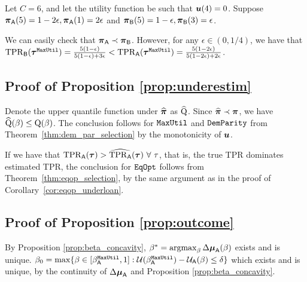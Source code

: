 	\begin{exmp}
		Let $C=6$, and let the utility function be such that 
		$\boldsymbol{u}(4) = 0$. 
		Suppose $\boldsymbol{\pi}_{\mathsf{A}}(5) = 1-2\epsilon, \boldsymbol{\pi}_{\mathsf{A}}(1) =  2\epsilon$ and $\boldsymbol{\pi}_{\mathsf{B}}(5) = 1-\epsilon, \boldsymbol{\pi}_{\mathsf{B}}(3) = \epsilon$.
		
		We can easily check that $\boldsymbol{\pi}_{\mathsf{A}}\prec \boldsymbol{\pi}_{\mathsf{B}}$. However, for any $\epsilon \in (0,1/4)$, we have that $\mathrm{TPR}_{\mathsf{B}}(\boldsymbol{\tau}^{\mathtt{MaxUtil}}) = \frac{5(1-\epsilon)}{5(1-\epsilon)+3\epsilon} < \mathrm{TPR}_{\mathsf{A}}(\boldsymbol{\tau}^{\mathtt{MaxUtil}}) = \frac{5(1-2\epsilon)}{5(1-2\epsilon)+2\epsilon}$.
		 
	\end{exmp}
	
	
	 \subsection{Proof of Proposition \ref{prop:underestim}}
	 
	 Denote the upper quantile function under $\widehat{\boldsymbol{\pi}}$ as $\widehat{\mathrm{Q}}$.
	 Since $\widehat{\boldsymbol{\pi}} \prec \boldsymbol{\pi}$, we have $\widehat{\mathrm{Q}}(\beta)\leq\mathrm{Q}(\beta)$. The conclusion follows for $\mathtt{MaxUtil}$ and $\mathtt{DemParity}$ from Theorem~\ref{thm:dem_par_selection} by the monotonicity of $\boldsymbol{u}$.
	 
	If we have that $\mathrm{TPR}_{\mathsf{A}}(\boldsymbol{\tau}) > \widehat{\mathrm{TPR}_{\mathsf{A}}}(\boldsymbol{\tau})~\forall~\tau$, that is, the true TPR dominates estimated TPR, the conclusion for $\mathtt{EqOpt}$ follows from Theorem~\ref{thm:eqop_selection}, by the same argument as in the proof of Corollary~\ref{cor:eqop_underloan}.
	 
	\subsection{Proof of Proposition \ref{prop:outcome}}

	
	 By Proposition \ref{prop:beta_concavity}, $\accrate^*=\argmax_\accrate \delmean\supa(\accrate)$ exists and is unique. $\beta_0=\max\{\beta \in [\beta_{\mathsf{A}}^{\mathtt{MaxUtil}},1]:\mathcal{U}(\beta_{\mathsf{A}}^{\mathtt{MaxUtil}}) - \mathcal{U}_{\mathsf{A}}(\beta) \leq \delta \}$  which exists and is unique, by the continuity of $\Delta\boldsymbol{\mu}_{\mathsf{A}}$ and Proposition \ref{prop:beta_concavity}.
	